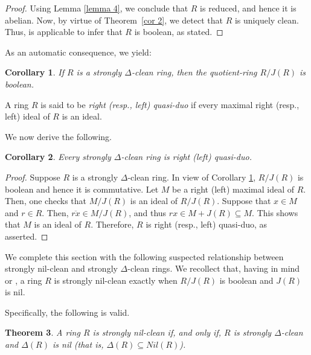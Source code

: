 \documentclass[12pt]{amsart}
\newtheorem{theorem}{Theorem}[section]
\newtheorem{corollary}[theorem]{Corollary}
\theoremstyle{definition}
\begin{document}
\begin{proof}
Using Lemma \ref{lemma 4}, we conclude that $R$ is reduced, and hence it is abelian. Now, by virtue of
Theorem~\ref{cor 2}, we detect that $R$ is uniquely clean. Thus, \cite[Theorem 19]{nzu} is applicable to infer that  $R$ is boolean, as stated.
\end{proof}

As an automatic consequence, we yield:

\begin{corollary}\label{booli}
If $R$ is a strongly $\Delta$-clean ring, then the quotient-ring $R/J(R)$ is boolean.
\end{corollary}

A ring $R$ is said to be {\it right (resp., left) quasi-duo} if every maximal right (resp., left) ideal of $R$ is an ideal.

\medskip

We now derive the following.

\begin{corollary}
Every strongly $\Delta$-clean ring is right (left) quasi-duo.
\end{corollary}

\begin{proof}
Suppose $R$ is a strongly $\Delta$-clean ring. In view of Corollary \ref{booli}, $R/J(R)$ is boolean and hence it is commutative. Let $M$ be a right (left) maximal ideal of $R$. Then, one checks that $M/J(R)$ is an ideal of $R/J(R)$. Suppose that $x\in M$ and $r\in R$. Then, $\overline{rx} \in M/J(R)$, and thus $rx\in M+J(R)\subseteq M$. This shows that $M$ is an ideal of $R$. Therefore, $R$ is right (resp., left) quasi-duo, as asserted.
\end{proof}

We complete this section with the following suspected relationship between strongly nil-clean and strongly $\Delta$-clean rings. We recollect that, having in mind \cite{dl} or \cite{kwz}, a ring $R$ is strongly nil-clean exactly when $R/J(R)$ is boolean and $J(R)$ is nil.

\medskip

Specifically, the following is valid.

\begin{theorem}\label{nil}
A ring $R$ is strongly nil-clean if, and only if, $R$ is strongly $\Delta$-clean and $\Delta(R)$ is nil (that is, $\Delta(R)\subseteq Nil(R)$).
\end{theorem}
\end{document}

